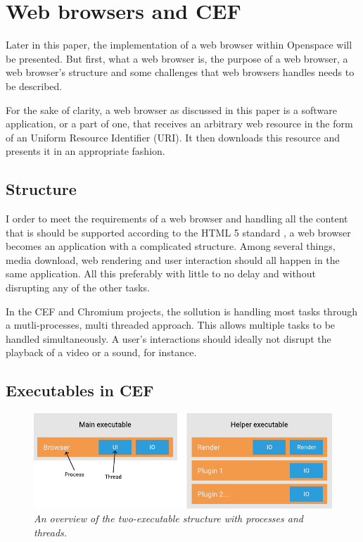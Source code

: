
\section{Web browsers and CEF}

Later in this paper, the implementation of a web browser within Openspace will be presented. But first, what a web browser is, the purpose of a web browser, a web browser's structure and some challenges that web browsers handles needs to be described.

For the sake of clarity, a web browser as discussed in this paper is a software application, or a part of one, that receives an arbitrary web resource in the form of an Uniform Resource Identifier (URI). \cite{jacobs2009uri} It then downloads this resource and presents it in an appropriate fashion.

\subsection{Structure}

I order to meet the requirements of a web browser and handling all the content that is should be supported according to the HTML 5 standard \cite{html}, a web browser becomes an application with a complicated structure. Among several things, media download, web rendering and user interaction should all happen in the same application. All this preferably with little to no delay and without disrupting any of the other tasks.

In the CEF and Chromium projects, the sollution is handling most tasks through a mutli-processes, multi threaded approach. \cite{cefusage} This allows multiple tasks to be handled simultaneously. A user's interactions should ideally not disrupt the playback of a video or a sound, for instance.


\subsection{Executables in CEF}

\begin{figure}[h]\label{fig:processes}
\centering
\includegraphics[width=0.9\linewidth]{./figures/process.pdf}
\caption{\emph{An overview of the two-executable structure with processes and threads.}}
\end{figure}

